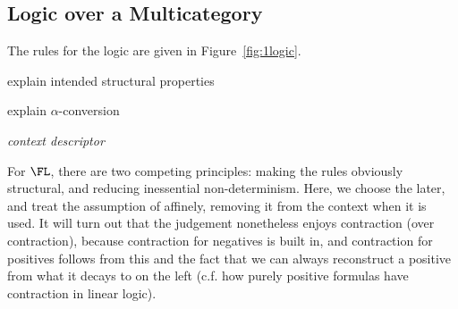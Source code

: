 \subsection{Logic over a Multicategory}

The rules for the logic are given in Figure~\ref{fig:1logic}.  

explain intended structural properties

explain $\alpha$-conversion

\emph{context descriptor} 

For $\FL$, there are two competing principles: making the rules
obviously structural, and reducing inessential non-determinism.  Here,
we choose the later, and treat the assumption of \F{\alpha}{\Delta}
affinely, removing it from the context when it is used.  It will turn
out that the judgement nonetheless enjoys contraction (over
contraction), because contraction for negatives is built in, and
contraction for positives follows from this and the fact that we can
always reconstruct a positive from what it decays to on the left
(c.f. how purely positive formulas have contraction in linear logic).  

